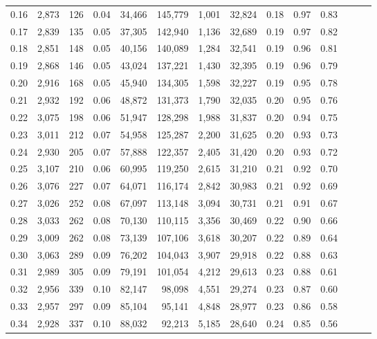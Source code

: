 \begin{tabular}{rrrrrrrrrrrrrr}
0.16 &  2,873 &  126 &  0.04 &   34,466 &  145,779 &   1,001 &  32,824 &  0.18 &  0.97 &      0.83 \\
0.17 &  2,839 &  135 &  0.05 &   37,305 &  142,940 &   1,136 &  32,689 &  0.19 &  0.97 &      0.82 \\
0.18 &  2,851 &  148 &  0.05 &   40,156 &  140,089 &   1,284 &  32,541 &  0.19 &  0.96 &      0.81 \\
0.19 &  2,868 &  146 &  0.05 &   43,024 &  137,221 &   1,430 &  32,395 &  0.19 &  0.96 &      0.79 \\
0.20 &  2,916 &  168 &  0.05 &   45,940 &  134,305 &   1,598 &  32,227 &  0.19 &  0.95 &      0.78 \\
0.21 &  2,932 &  192 &  0.06 &   48,872 &  131,373 &   1,790 &  32,035 &  0.20 &  0.95 &      0.76 \\
0.22 &  3,075 &  198 &  0.06 &   51,947 &  128,298 &   1,988 &  31,837 &  0.20 &  0.94 &      0.75 \\
0.23 &  3,011 &  212 &  0.07 &   54,958 &  125,287 &   2,200 &  31,625 &  0.20 &  0.93 &      0.73 \\
0.24 &  2,930 &  205 &  0.07 &   57,888 &  122,357 &   2,405 &  31,420 &  0.20 &  0.93 &      0.72 \\
0.25 &  3,107 &  210 &  0.06 &   60,995 &  119,250 &   2,615 &  31,210 &  0.21 &  0.92 &      0.70 \\
0.26 &  3,076 &  227 &  0.07 &   64,071 &  116,174 &   2,842 &  30,983 &  0.21 &  0.92 &      0.69 \\
0.27 &  3,026 &  252 &  0.08 &   67,097 &  113,148 &   3,094 &  30,731 &  0.21 &  0.91 &      0.67 \\
0.28 &  3,033 &  262 &  0.08 &   70,130 &  110,115 &   3,356 &  30,469 &  0.22 &  0.90 &      0.66 \\
0.29 &  3,009 &  262 &  0.08 &   73,139 &  107,106 &   3,618 &  30,207 &  0.22 &  0.89 &      0.64 \\
0.30 &  3,063 &  289 &  0.09 &   76,202 &  104,043 &   3,907 &  29,918 &  0.22 &  0.88 &      0.63 \\
0.31 &  2,989 &  305 &  0.09 &   79,191 &  101,054 &   4,212 &  29,613 &  0.23 &  0.88 &      0.61 \\
0.32 &  2,956 &  339 &  0.10 &   82,147 &   98,098 &   4,551 &  29,274 &  0.23 &  0.87 &      0.60 \\
0.33 &  2,957 &  297 &  0.09 &   85,104 &   95,141 &   4,848 &  28,977 &  0.23 &  0.86 &      0.58 \\
0.34 &  2,928 &  337 &  0.10 &   88,032 &   92,213 &   5,185 &  28,640 &  0.24 &  0.85 &      0.56 \\

\end{tabular}
